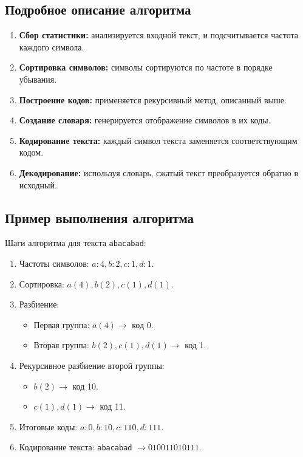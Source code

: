 \documentclass[a4paper,14pt]{article}
\begin{document}
\subsection{Подробное описание алгоритма}
\begin{enumerate}
    \item \textbf{Сбор статистики:} анализируется входной текст, и подсчитывается частота каждого символа.
    \item \textbf{Сортировка символов:} символы сортируются по частоте в порядке убывания.
    \item \textbf{Построение кодов:} применяется рекурсивный метод, описанный выше.
    \item \textbf{Создание словаря:} генерируется отображение символов в их коды.
    \item \textbf{Кодирование текста:} каждый символ текста заменяется соответствующим кодом.
    \item \textbf{Декодирование:} используя словарь, сжатый текст преобразуется обратно в исходный.
\end{enumerate}

\subsection{Пример выполнения алгоритма}
Шаги алгоритма для текста \texttt{abacabad}:
\begin{enumerate}
    \item Частоты символов: $a: 4, b: 2, c: 1, d: 1$.
    \item Сортировка: $a (4), b (2), c (1), d (1)$.
    \item Разбиение: \begin{itemize}
        \item Первая группа: $a (4) \to$ код 0.
        \item Вторая группа: $b (2), c (1), d (1) \to$ код 1.
    \end{itemize}
    \item Рекурсивное разбиение второй группы:
        \begin{itemize}
            \item $b (2) \to$ код 10.
            \item $c (1), d (1) \to$ код 11.
        \end{itemize}
    \item Итоговые коды: $a: 0, b: 10, c: 110, d: 111$.
    \item Кодирование текста: \texttt{abacabad} $\to 010011010111$.
\end{enumerate}
\end{document}
